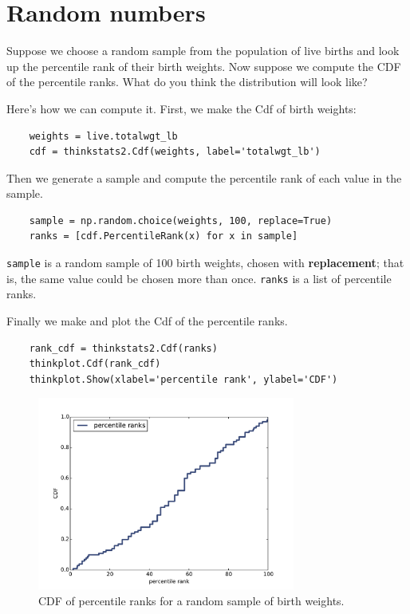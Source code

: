 \documentclass[12pt]{book}
\begin{document}
\section{Random numbers}
\label{random}

Suppose we choose a random sample from the population of live
births and look up the percentile rank of their birth weights.
Now suppose we compute the CDF of the percentile ranks.  What do
you think the distribution will look like?

Here's how we can compute it.  First, we make the Cdf of
birth weights:

\begin{verbatim}
    weights = live.totalwgt_lb
    cdf = thinkstats2.Cdf(weights, label='totalwgt_lb')
\end{verbatim}

Then we generate a sample and compute the percentile rank of
each value in the sample.

\begin{verbatim}
    sample = np.random.choice(weights, 100, replace=True)
    ranks = [cdf.PercentileRank(x) for x in sample]
\end{verbatim}

{\tt sample}
is a random sample of 100 birth weights, chosen with {\bf replacement};
that is, the same value could be chosen more than once.  {\tt ranks}
is a list of percentile ranks.

Finally we make and plot the Cdf of the percentile ranks.

\begin{verbatim}
    rank_cdf = thinkstats2.Cdf(ranks)
    thinkplot.Cdf(rank_cdf)
    thinkplot.Show(xlabel='percentile rank', ylabel='CDF')
\end{verbatim}

\begin{figure}
\centerline{\includegraphics[height=2.5in]{figs/cumulative_random.pdf}}
\caption{CDF of percentile ranks for a random sample of birth weights.}
\label{cumulative_random}
\end{figure}
\end{document}
